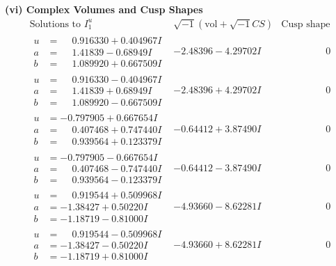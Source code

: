 \documentclass[1p]{elsarticle_modified}
\theoremstyle{definition}
\newcommand{\I}{\sqrt{-1}}
\begin{document}
\newpage\flushleft \textbf{(vi) Complex Volumes and Cusp Shapes}
$$\begin{array}{c|c|c}  
\text{Solutions to }I^u_{1}& \I (\text{vol} + \sqrt{-1}CS) & \text{Cusp shape}\\
 \hline 
\begin{aligned}
u &= \phantom{-}0.916330 + 0.404967 I \\
a &= \phantom{-}1.41839 - 0.68949 I \\
b &= \phantom{-}1.089920 + 0.667509 I\end{aligned}
 & -2.48396 - 4.29702 I & \phantom{-0.000000 } 0 \\ \hline\begin{aligned}
u &= \phantom{-}0.916330 - 0.404967 I \\
a &= \phantom{-}1.41839 + 0.68949 I \\
b &= \phantom{-}1.089920 - 0.667509 I\end{aligned}
 & -2.48396 + 4.29702 I & \phantom{-0.000000 } 0 \\ \hline\begin{aligned}
u &= -0.797905 + 0.667654 I \\
a &= \phantom{-}0.407468 + 0.747440 I \\
b &= \phantom{-}0.939564 + 0.123379 I\end{aligned}
 & -0.64412 + 3.87490 I & \phantom{-0.000000 } 0 \\ \hline\begin{aligned}
u &= -0.797905 - 0.667654 I \\
a &= \phantom{-}0.407468 - 0.747440 I \\
b &= \phantom{-}0.939564 - 0.123379 I\end{aligned}
 & -0.64412 - 3.87490 I & \phantom{-0.000000 } 0 \\ \hline\begin{aligned}
u &= \phantom{-}0.919544 + 0.509968 I \\
a &= -1.38427 + 0.50220 I \\
b &= -1.18719 - 0.81000 I\end{aligned}
 & -4.93660 - 8.62281 I & \phantom{-0.000000 } 0 \\ \hline\begin{aligned}
u &= \phantom{-}0.919544 - 0.509968 I \\
a &= -1.38427 - 0.50220 I \\
b &= -1.18719 + 0.81000 I\end{aligned}
 & -4.93660 + 8.62281 I & \phantom{-0.000000 } 0 \\ \hline\begin{aligned}

\end{aligned}
\end{array}$$
\end{document}
